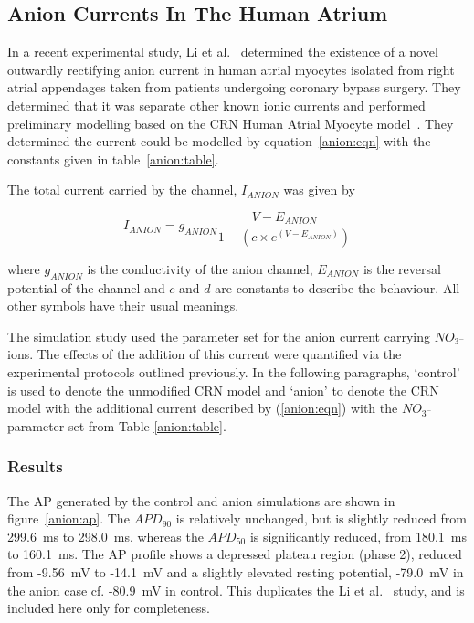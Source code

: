 \subsection{Anion Currents In The Human Atrium}

In a recent experimental study, Li et al.~\cite{li2007} determined the existence
of a novel outwardly rectifying anion current in human atrial myocytes isolated
from right atrial appendages taken from patients undergoing coronary bypass
surgery.  They determined that it was separate other known ionic currents and
performed preliminary modelling based on the CRN Human Atrial Myocyte
model~\cite{crn98}.  They determined the current could be modelled by
equation~\ref{anion:eqn} with the constants given in table~\ref{anion:table}.

The total current carried by the channel, $I_{ANION}$ was given by

\begin{equation}
\label{anion:eqn}
I_{ANION} = g_{ANION} \frac{V-E_{ANION}}{1-\left(c\times e^{\left(V-E_{ANION}\right)}\right)}
\end{equation}

where $g_{ANION}$ is the conductivity of the anion channel, $E_{ANION}$ is
the reversal potential of the channel and $c$ and $d$ are constants to
describe the behaviour.  All other symbols have their usual meanings.

The simulation study used the parameter set for the anion current carrying
$NO_{3^{-}}$ ions.  The effects of the addition of this current were quantified
via the experimental protocols outlined previously.  In the following
paragraphs, `control' is used to denote the unmodified CRN model and `anion' to
denote the CRN model with the additional current described by (\ref{anion:eqn})
with the $NO_{3^{-}}$ parameter set from Table \ref{anion:table}.

\subsubsection{Results}

The AP generated by the control and anion simulations are shown in
figure~\ref{anion:ap}.  The $APD_{90}$ is relatively unchanged, but is slightly
reduced from 299.6~ms to 298.0~ms, whereas the $APD_{50}$ is significantly
reduced, from 180.1~ms to 160.1~ms.  The AP profile shows a depressed plateau region (phase
2), reduced from -9.56~mV to -14.1~mV and a slightly elevated resting potential,
-79.0~mV in the anion case cf. -80.9~mV in control.  This duplicates the Li et
al.~\cite{li2007} study, and is included here only for completeness.

